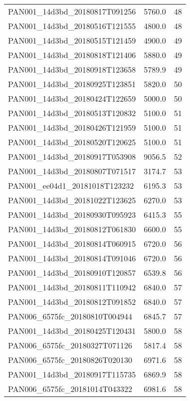 \begin{tabular}{lrr}
PAN001\_14d3bd\_20180817T091256 &     5760.0 &       48 \\
PAN001\_14d3bd\_20180516T121555 &     4800.0 &       48 \\
PAN001\_14d3bd\_20180515T121459 &     4900.0 &       49 \\
PAN001\_14d3bd\_20180818T121406 &     5880.0 &       49 \\
PAN001\_14d3bd\_20180918T123658 &     5789.9 &       49 \\
PAN001\_14d3bd\_20180925T123851 &     5820.0 &       50 \\
PAN001\_14d3bd\_20180424T122659 &     5000.0 &       50 \\
PAN001\_14d3bd\_20180513T120832 &     5100.0 &       51 \\
PAN001\_14d3bd\_20180426T121959 &     5100.0 &       51 \\
PAN001\_14d3bd\_20180520T120625 &     5100.0 &       51 \\
PAN001\_14d3bd\_20180917T053908 &     9056.5 &       52 \\
PAN001\_14d3bd\_20180807T071517 &     3174.7 &       53 \\
PAN001\_ee04d1\_20181018T123232 &     6195.3 &       53 \\
PAN001\_14d3bd\_20181022T123625 &     6270.0 &       53 \\
PAN001\_14d3bd\_20180930T095923 &     6415.3 &       55 \\
PAN001\_14d3bd\_20180812T061830 &     6600.0 &       55 \\
PAN001\_14d3bd\_20180814T060915 &     6720.0 &       56 \\
PAN001\_14d3bd\_20180814T091046 &     6720.0 &       56 \\
PAN001\_14d3bd\_20180910T120857 &     6539.8 &       56 \\
PAN001\_14d3bd\_20180811T110942 &     6840.0 &       57 \\
PAN001\_14d3bd\_20180812T091852 &     6840.0 &       57 \\
PAN006\_6575fc\_20180810T004944 &     6845.7 &       57 \\
PAN001\_14d3bd\_20180425T120431 &     5800.0 &       58 \\
PAN006\_6575fc\_20180327T071126 &     5817.4 &       58 \\
PAN006\_6575fc\_20180826T020130 &     6971.6 &       58 \\
PAN001\_14d3bd\_20180917T115735 &     6869.9 &       58 \\
PAN006\_6575fc\_20181014T043322 &     6981.6 &       58 \\

\end{tabular}
